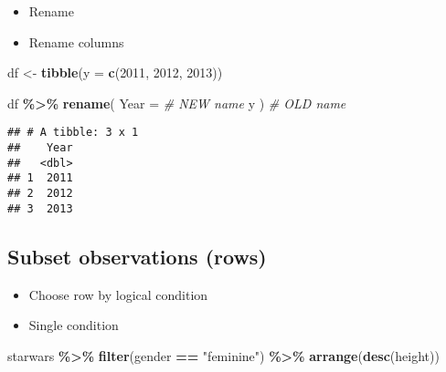 \documentclass[
]{book}
\newenvironment{Shaded}{\begin{snugshade}}{\end{snugshade}}
\newcommand{\CommentTok}[1]{\textcolor[rgb]{0.56,0.35,0.01}{\textit{#1}}}
\newcommand{\DataTypeTok}[1]{\textcolor[rgb]{0.13,0.29,0.53}{#1}}
\newcommand{\DecValTok}[1]{\textcolor[rgb]{0.00,0.00,0.81}{#1}}
\newcommand{\KeywordTok}[1]{\textcolor[rgb]{0.13,0.29,0.53}{\textbf{#1}}}
\newcommand{\NormalTok}[1]{#1}
\newcommand{\OperatorTok}[1]{\textcolor[rgb]{0.81,0.36,0.00}{\textbf{#1}}}
\newcommand{\StringTok}[1]{\textcolor[rgb]{0.31,0.60,0.02}{#1}}
\begin{document}
\begin{itemize}
\item
  Rename
\item
  Rename columns
\end{itemize}

\begin{Shaded}
\begin{Highlighting}[]
\NormalTok{df \textless{}{-}}\StringTok{ }\KeywordTok{tibble}\NormalTok{(}\DataTypeTok{y =} \KeywordTok{c}\NormalTok{(}\DecValTok{2011}\NormalTok{, }\DecValTok{2012}\NormalTok{, }\DecValTok{2013}\NormalTok{))}

\NormalTok{df }\OperatorTok{\%\textgreater{}\%}
\StringTok{  }\KeywordTok{rename}\NormalTok{(}
    \DataTypeTok{Year =} \CommentTok{\# NEW name}
\NormalTok{    y}
\NormalTok{  ) }\CommentTok{\# OLD name}
\end{Highlighting}
\end{Shaded}

\begin{verbatim}
## # A tibble: 3 x 1
##    Year
##   <dbl>
## 1  2011
## 2  2012
## 3  2013
\end{verbatim}

\hypertarget{subset-observations-rows}{%
\subsection{Subset observations (rows)}\label{subset-observations-rows}}

\begin{itemize}
\item
  Choose row by logical condition
\item
  Single condition
\end{itemize}

\begin{Shaded}
\begin{Highlighting}[]
\NormalTok{starwars }\OperatorTok{\%\textgreater{}\%}
\StringTok{  }\KeywordTok{filter}\NormalTok{(gender }\OperatorTok{==}\StringTok{ "feminine"}\NormalTok{) }\OperatorTok{\%\textgreater{}\%}
\StringTok{  }\KeywordTok{arrange}\NormalTok{(}\KeywordTok{desc}\NormalTok{(height))}
\end{Highlighting}
\end{Shaded}
\end{document}
